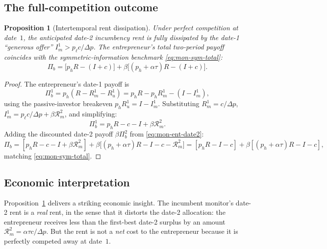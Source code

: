 \documentclass[11pt,a4paper,oneside]{book}
\theoremstyle{plain}
\newtheorem{proposition}[theorem]{Proposition}
\theoremstyle{definition}
\theoremstyle{remark}
\numberwithin{equation}{chapter}
\begin{document}
\subsection{The full-competition outcome}

\begin{proposition}[Intertemporal rent dissipation]\label{prop:mon-dissipation}
Under perfect competition at date~$1$, the anticipated date-2 incumbency rent is fully dissipated by the date-1 ``generous offer'' $I_m^1 > p_\ell c/\Delta p$.
The entrepreneur's total two-period payoff coincides with the symmetric-information benchmark \eqref{eq:mon-sym-total}:
\begin{equation*}
  \Pi_b = \bigl[p_h R - (I + c)\bigr] + \beta \bigl[(p_h + \alpha \tau) R - (I + c)\bigr].
\end{equation*}
\end{proposition}

\begin{proof}
The entrepreneur's date-1 payoff is
\begin{equation*}
  \Pi_b^1 = p_h (R - R_m^1 - R_u^1) = p_h R - p_h R_m^1 - (I - I_m^1),
\end{equation*}
using the passive-investor breakeven $p_h R_u^1 = I - I_m^1$.
Substituting $R_m^1 = c/\Delta p$, $I_m^1 = p_\ell c/\Delta p + \beta \mathcal{R}_m^2$, and simplifying:
\begin{equation*}
  \Pi_b^1 = p_h R - c - I + \beta \mathcal{R}_m^2.
\end{equation*}
Adding the discounted date-2 payoff $\beta \Pi_b^2$ from \eqref{eq:mon-ent-date2}:
\begin{equation*}
  \Pi_b = [p_h R - c - I + \beta \mathcal{R}_m^2] + \beta \bigl[(p_h + \alpha \tau) R - I - c - \mathcal{R}_m^2\bigr] = [p_h R - I - c] + \beta [(p_h + \alpha \tau) R - I - c],
\end{equation*}
matching \eqref{eq:mon-sym-total}.
\end{proof}

\subsection{Economic interpretation}

Proposition~\ref{prop:mon-dissipation} delivers a striking economic insight.
The incumbent monitor's date-2 rent is a \emph{real} rent, in the sense that it distorts the date-2 allocation: the entrepreneur receives less than the first-best date-2 surplus by an amount $\mathcal{R}_m^2 = \alpha \tau c/\Delta p$.
But the rent is not a \emph{net} cost to the entrepreneur because it is perfectly competed away at date~$1$.
\end{document}
